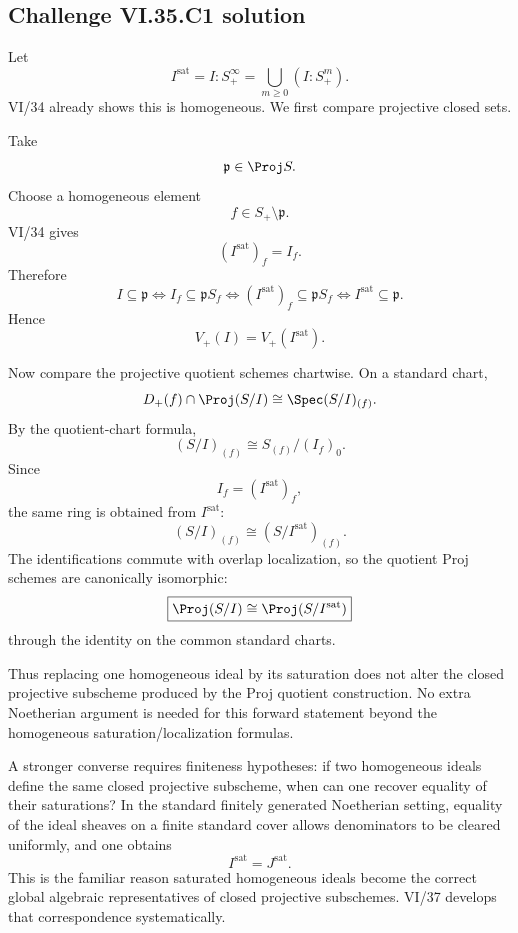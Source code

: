 
\subsection*{Challenge VI.35.C1 solution}
\begin{solution}
Let
\[
I^{\mathrm{sat}}
=
I:S_+^\infty
=
\bigcup_{m\ge0}(I:S_+^m).
\]
VI/34 already shows this is homogeneous.  We first compare projective closed sets.

Take
\[
\mathfrak p\in\Proj S.
\]
Choose a homogeneous element
\[
f\in S_+\setminus\mathfrak p.
\]
VI/34 gives
\[
(I^{\mathrm{sat}})_f=I_f.
\]
Therefore
\[
I\subseteq\mathfrak p
\iff
I_f\subseteq\mathfrak pS_f
\iff
(I^{\mathrm{sat}})_f\subseteq\mathfrak pS_f
\iff
I^{\mathrm{sat}}\subseteq\mathfrak p.
\]
Hence
\[
\boxed{V_+(I)=V_+(I^{\mathrm{sat}})}.
\]

Now compare the projective quotient schemes chartwise.  On a standard chart,
\[
D_+(f)\cap\Proj(S/I)
\cong
\Spec (S/I)_{(f)}.
\]
By the quotient-chart formula,
\[
(S/I)_{(f)}
\cong
S_{(f)}/(I_f)_0.
\]
Since
\[
I_f=(I^{\mathrm{sat}})_f,
\]
the same ring is obtained from \(I^{\mathrm{sat}}\):
\[
(S/I)_{(f)}
\cong
(S/I^{\mathrm{sat}})_{(f)}.
\]
The identifications commute with overlap localization, so the quotient Proj schemes are canonically isomorphic:
\[
\boxed{
\Proj(S/I)\cong\Proj(S/I^{\mathrm{sat}})
}
\]
through the identity on the common standard charts.

Thus replacing one homogeneous ideal by its saturation does not alter the closed projective subscheme produced by
the Proj quotient construction.  No extra Noetherian argument is needed for this forward statement beyond the
homogeneous saturation/localization formulas.

A stronger converse requires finiteness hypotheses: if two homogeneous ideals define the same closed projective
subscheme, when can one recover equality of their saturations?  In the standard finitely generated Noetherian
setting, equality of the ideal sheaves on a finite standard cover allows denominators to be cleared uniformly, and
one obtains
\[
I^{\mathrm{sat}}=J^{\mathrm{sat}}.
\]
This is the familiar reason saturated homogeneous ideals become the correct global algebraic representatives of
closed projective subschemes.  VI/37 develops that correspondence systematically.
\end{solution}

